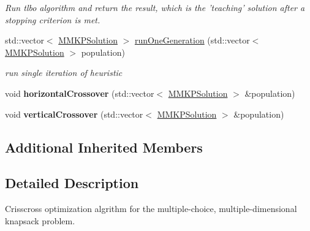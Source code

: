\begin{DoxyCompactItemize}
\begin{DoxyCompactList}\small\item\em Run tlbo algorithm and return the result, which is the 'teaching' solution after a stopping criterion is met. \end{DoxyCompactList}\item 
\hypertarget{class_m_m_k_p___c_o_a_a4704c6e6cc3ff9f23af8a6a5e6943746}{std\+::vector$<$ \hyperlink{class_m_m_k_p_solution}{M\+M\+K\+P\+Solution} $>$ \hyperlink{class_m_m_k_p___c_o_a_a4704c6e6cc3ff9f23af8a6a5e6943746}{run\+One\+Generation} (std\+::vector$<$ \hyperlink{class_m_m_k_p_solution}{M\+M\+K\+P\+Solution} $>$ population)}\label{class_m_m_k_p___c_o_a_a4704c6e6cc3ff9f23af8a6a5e6943746}

\begin{DoxyCompactList}\small\item\em run single iteration of heuristic \end{DoxyCompactList}\item 
\hypertarget{class_m_m_k_p___c_o_a_ac844d27466908cc418b84821fd26a8cd}{void {\bfseries horizontal\+Crossover} (std\+::vector$<$ \hyperlink{class_m_m_k_p_solution}{M\+M\+K\+P\+Solution} $>$ \&population)}\label{class_m_m_k_p___c_o_a_ac844d27466908cc418b84821fd26a8cd}

\item 
\hypertarget{class_m_m_k_p___c_o_a_a030d4eb88e3df0523bf0d7673d7162ff}{void {\bfseries vertical\+Crossover} (std\+::vector$<$ \hyperlink{class_m_m_k_p_solution}{M\+M\+K\+P\+Solution} $>$ \&population)}\label{class_m_m_k_p___c_o_a_a030d4eb88e3df0523bf0d7673d7162ff}

\end{DoxyCompactItemize}
\subsection*{Additional Inherited Members}


\subsection{Detailed Description}
Crisscross optimization algrithm for the multiple-\/choice, multiple-\/dimensional knapsack problem. 

